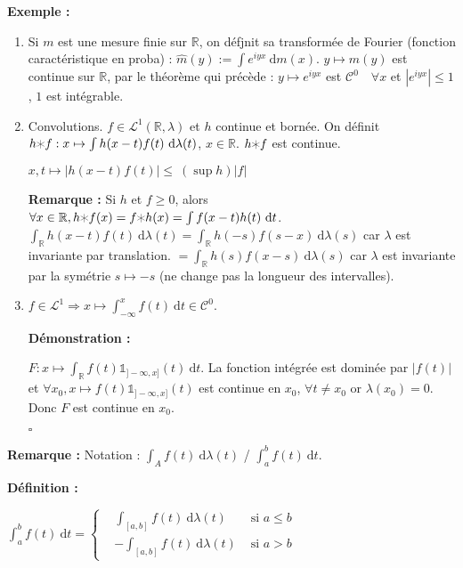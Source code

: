 \documentclass[10pt,a4paper,notitlepage ]{report}
\newcommand{\R}{\mathbb R}
\newcommand{\dd}{\ \mathrm d}
\newcommand{\1}{\mathds 1}
\newcommand{\LL}{\mathcal L}
\newenvironment{definition}[1][]{
	
	\textbf{Définition #1 : }
}
{}
\newcounter{th}
\newenvironment{demo}[1][]{

	\textbf{Démonstration #1 :}
}{\begin{flushright}
	$\square$
\end{flushright}
}
\newenvironment{exemple}{
	
	\textbf{Exemple :} }{}
\newenvironment{rem}{
	
		\textbf{Remarque :}}{}
\begin{document}
\begin{exemple}
	\begin{enumerate}
		\item Si $m$ est une mesure finie sur $\R$, on défjnit sa transformée de Fourier (fonction caractéristique en proba) : $\hat m(y) := \int e^{iyx}\dd m(x)$.
		$y\mapsto \hat m(y)$ est continue sur $\R$, par le théorème qui précède :
		$y\mapsto e^{iyx}$ est $\mathcal C^0 \quad \forall x$ et $|e^{iyx}|\le 1$, $1$ est intégrable.
		\item Convolutions. $f \in \LL^1(\R,\lambda)$ et $h$ continue et bornée. On définit $h\varhexstar f : x \mapsto \int h(x-t)f(t)\dd \lambda(t)$, $x\in\R$.
		$h\varhexstar f$ est continue.
		
		$x,t\mapsto |h(x-t)f(t)| \le \ (\sup h)|f|$
		\begin{rem}
			Si $h$ et $f\ge 0$, alors $\forall x\in\R, h\varhexstar f(x) = f\varhexstar h(x) = \int f(x-t)h(t) \dd t$.
			$\int_\R h(x-t)f(t)\dd\lambda(t) = \int_\R h(-s)f(s-x) \dd\lambda(s)$ car $\lambda$ est invariante par translation.
			$= \int_\R h(s)f(x-s)\dd\lambda(s)$ car $\lambda$ est invariante par la symétrie $s\mapsto -s$ (ne change pas la longueur des intervalles).
		\end{rem}
	\item $f\in\LL^1 \Rightarrow x\mapsto \int_{-\infty}^x f(t) \dd t \in \mathcal C^0$.
	\begin{demo}
		$F : x\mapsto \int _\R f(t)\1_{]-\infty,x]}(t)\dd t$. La fonction intégrée est dominée par $|f(t)|$ et $\forall x_0, x\mapsto f(t)\1_{]-\infty,x]}(t)$ est continue en $x_0$, $\forall t \neq x_0$ or $\lambda({x_0}) = 0$. Donc $F$ est continue en $x_0$.
	\end{demo}
	\end{enumerate}
\end{exemple}
\begin{rem}
	Notation : $\int_A f(t)\dd \lambda(t)$ / $\int_a^b f(t)\dd t$.
	\begin{definition}
		$\int_a^b f(t) \dd t = \left\{\begin{aligned}
			&\int_{[a,b]} f(t)\dd\lambda(t)&\text{ si } a\le b\\
			&-\int_{[a,b]}f(t)\dd \lambda(t)&\text{ si } a > b
		\end{aligned} \right.$
	\end{definition}
\end{rem}
\end{document}
